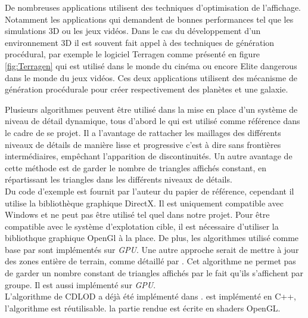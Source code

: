 \documentclass[12pt]{report}
\begin{document}

De nombreuses applications utilisent des techniques d'optimisation de
l'affichage. Notamment les applications qui demandent de bonnes
performances tel que les simulations 3D ou les jeux vidéos.
Dans le cas du développement d'un environnement 3D il est souvent fait
appel à des techniques de génération procédural, par exemple le logiciel
Terragen comme présenté en figure \ref{fig:Terragen} qui est utilisé dans le monde du cinéma ou encore Elite
dangerous dans le monde du jeux vidéos.  Ces deux applications utilisent
des mécanisme de génération procédurale pour créer respectivement des
planètes et une galaxie.

Plusieurs algorithmes peuvent être utilisé dans la mise en place d'un
système de niveau de détail dynamique, tous d'abord le \cite{CDLOD} qui
est utilisé comme référence dans le cadre de se projet.  Il a l'avantage
de rattacher les maillages des différents niveaux de détails de manière
lisse et progressive c'est à dire sans frontières intermédiaires,
empêchant l'apparition de discontinuités.  Un autre avantage de cette
méthode est de garder le nombre de triangles affichés constant, en
répartissant les triangles dans les différents niveaux de détails.\\
Du code d'exemple est fournit par l'auteur du papier de référence,
cependant il utilise la bibliothèque graphique DirectX. Il est
uniquement compatible avec Windows et ne peut pas être utilisé tel quel
dans notre projet.  Pour être compatible avec le système d'explotation
cible, il est nécessaire d'utiliser la bibliothque graphique OpenGl à la
place. De plus, les algorithmes utilisé comme base par \cite{CDLOD} sont
implémentés sur \emph{GPU}.  Une autre approche serait de mettre à jour
des zones entière de terrain, comme détaillé par \cite{MassiveTerrain}.
Cet algorithme ne permet pas de garder un nombre constant de triangles
affichés par le fait qu'ils s'affichent par groupe. Il est aussi
implémenté sur \emph{GPU}.\\
L'algorithme de CDLOD a déjà été implémenté dans \cite{WorldGenerator}.
\cite{WorldGenerator} est implémenté en C++, l'algorithme est
réutilisable. la partie rendue est écrite en shaders OpenGL.
\end{document}
